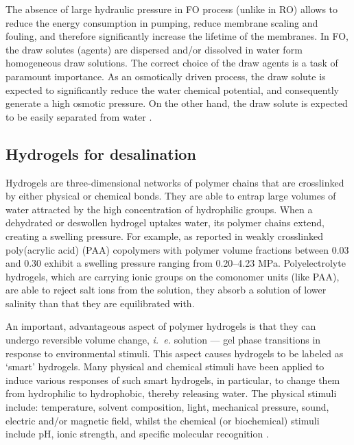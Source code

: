 \documentclass[journal,article,submit,pdftex,moreauthors]{Definitions/mdpi}
\newcommand{\ie}{\textit{i.~e.} }
\begin{document}
The absence of large hydraulic pressure in FO process (unlike in RO) allows to reduce the energy consumption in pumping, reduce membrane scaling and fouling, and therefore significantly increase the lifetime of the membranes. 
In FO, the draw solutes (agents) are dispersed and/or dissolved in water form homogeneous draw solutions. 
The correct choice of the draw agents is a task of paramount importance. 
As an osmotically driven process, the draw solute is expected to significantly reduce the water chemical potential, and consequently generate a high osmotic pressure. 
On the other hand, the draw solute is expected to be easily separated from water \cite{Cai2016}.

\subsection{Hydrogels for desalination}
Hydrogels are three-dimensional networks of polymer chains that are crosslinked by either physical or chemical bonds. 
They are able to entrap large volumes of water attracted by the high concentration of hydrophilic groups. 
When a dehydrated or deswollen hydrogel uptakes water, its polymer chains extend, creating a swelling pressure. 
For example, as reported in \cite{Wack_2009} weakly crosslinked poly(acrylic acid) (PAA) copolymers with polymer volume fractions between 0.03 and 0.30 exhibit a swelling pressure ranging from 0.20--4.23 MPa.
Polyelectrolyte hydrogels, which are carrying ionic groups on the comonomer units (like PAA), are able to reject salt ions from the solution, they absorb a solution of lower salinity than that they are equilibrated with. 

An important, advantageous aspect of polymer hydrogels is that they can undergo reversible volume change, \ie solution --- gel phase transitions in response to environmental stimuli. 
This aspect causes hydrogels to be labeled as ‘smart’ hydrogels. 
Many physical and chemical stimuli have been applied to induce various responses of such smart hydrogels, in particular, to change them from hydrophilic to hydrophobic, thereby releasing water. 
The physical stimuli include: temperature, solvent composition, light, mechanical pressure, sound, electric and/or magnetic field, whilst the chemical (or biochemical) stimuli include pH, ionic strength, and specific molecular recognition \cite{Tanaka_1982,Serizawa_2001,Lietor_Santos_2009,Qiu_2001}.
\end{document}

